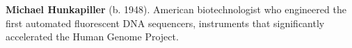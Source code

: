 \textbf{Michael Hunkapiller} (b. 1948). American biotechnologist who engineered the first automated fluorescent DNA sequencers, instruments that significantly accelerated the Human Genome Project.

